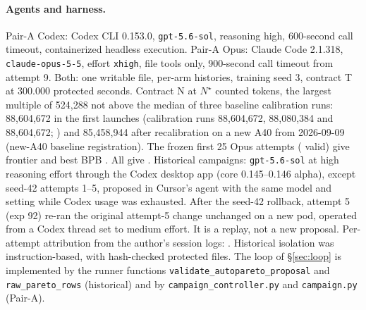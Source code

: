 \documentclass{article}
\begin{document}
\paragraph{Agents and harness.} Pair-A Codex: Codex CLI 0.153.0, \texttt{gpt-5.6-sol}, reasoning high, 600-second call timeout, containerized headless execution. Pair-A Opus: Claude Code 2.1.318, \texttt{claude-opus-5-5}, effort \texttt{xhigh}, file tools only, 900-second call timeout from attempt 9. Both: one writable file, per-arm histories, training seed 3, contract T at 300.000 protected seconds. Contract N at $N^\star$ counted tokens, the largest multiple of 524,288 not above the median of three baseline calibration runs: 88,604,672 in the first launches (calibration runs 88,604,672, 88,080,384 and 88,604,672; ) and 85,458,944 after recalibration on a new A40 from 2026-09-09 (new-A40 baseline registration). The frozen first 25 Opus attempts (\CROpValidFrozen{} valid) give frontier \CROpFrontierFrozen{} and best BPB \CROpBestFrozen. All \CROpAttempts{} give \CROpFrontierExtended. Historical campaigns: \texttt{gpt-5.6-sol} at high reasoning effort through the Codex desktop app (core 0.145--0.146 alpha), except seed-42 attempts 1--5, proposed in Cursor's agent with the same model and setting while Codex usage was exhausted. After the seed-42 rollback, attempt 5 (exp 92) re-ran the original attempt-5 change unchanged on a new pod, operated from a Codex thread set to medium effort. It is a replay, not a new proposal. Per-attempt attribution from the author's session logs: . Historical isolation was instruction-based, with hash-checked protected files. The loop of \S\ref{sec:loop} is implemented by the runner functions \texttt{validate\_autopareto\_proposal} and \texttt{raw\_pareto\_rows} (historical) and by \texttt{campaign\_controller.py} and \texttt{campaign.py} (Pair-A).
\end{document}
